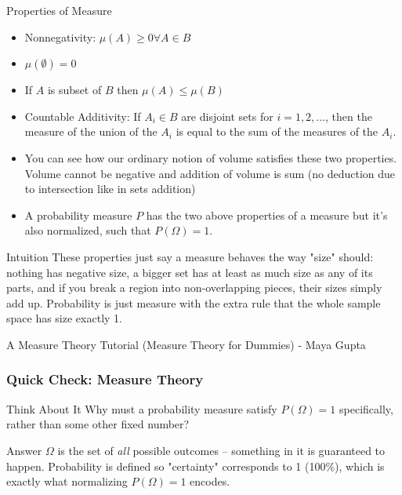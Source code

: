   \begin{frame}[fragile]{Properties of Measure}
\begin{itemize} 
\item Nonnegativity: $\mu(A) \geq 0 \forall A \in B$
\item $\mu(\emptyset) = 0$
\item If $A$ is subset of $B$ then $\mu(A) \leq \mu(B)$
\item Countable Additivity: If $A_i \in B$ are disjoint sets for $i = 1, 2, \ldots$, then the measure of the union of the $A_i$ is equal to the sum of the measures of the $A_i$.
\item You can see how our ordinary notion of volume satisfies these two properties. Volume cannot be negative and addition of volume is sum (no deduction due to intersection like in sets addition)
\item A probability measure $P$ has
the two above properties of a measure but it’s also normalized, such that $P(\Omega) = 1$.

\end{itemize}

\begin{block}{Intuition}
These properties just say a measure behaves the way "size" should: nothing has negative size, a bigger set has at least as much size as any of its parts, and if you break a region into non-overlapping pieces, their sizes simply add up. Probability is just measure with the extra rule that the whole sample space has size exactly 1.
\end{block}

\tiny{A Measure Theory Tutorial (Measure Theory for Dummies) - Maya Gupta}
\end{frame}

\begin{frame}[fragile]\frametitle{Quick Check: Measure Theory}
\begin{block}{Think About It}
Why must a probability measure satisfy $P(\Omega) = 1$ specifically, rather than some other fixed number?
\end{block}
\pause
\begin{block}{Answer}
$\Omega$ is the set of \emph{all} possible outcomes -- something in it is guaranteed to happen. Probability is defined so "certainty" corresponds to 1 (100\%), which is exactly what normalizing $P(\Omega)=1$ encodes.
\end{block}
\end{frame}